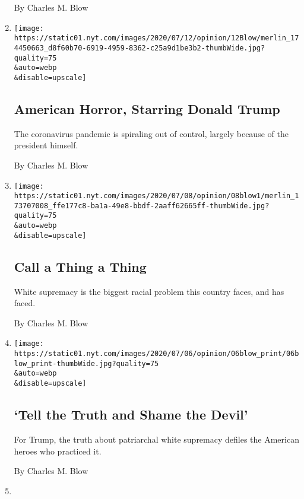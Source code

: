 \begin{enumerate}
  By Charles M. Blow
\item
  \href{/2020/07/12/opinion/coronavirus-donald-trump.html}{}

  \texttt{[image: https://static01.nyt.com/images/2020/07/12/opinion/12Blow/merlin\_174450663\_d8f60b70-6919-4959-8362-c25a9d1be3b2-thumbWide.jpg?quality=75\\\&auto=webp\\\&disable=upscale]}

  \hypertarget{american-horror-starring-donald-trump}{%
  \subsection{American Horror, Starring Donald
  Trump}\label{american-horror-starring-donald-trump}}

  The coronavirus pandemic is spiraling out of control, largely because
  of the president himself.

  By Charles M. Blow
\item
  \href{/2020/07/08/opinion/racism-united-states.html}{}

  \texttt{[image: https://static01.nyt.com/images/2020/07/08/opinion/08blow1/merlin\_173707008\_ffe177c8-ba1a-49e8-bbdf-2aaff62665ff-thumbWide.jpg?quality=75\\\&auto=webp\\\&disable=upscale]}

  \hypertarget{call-a-thing-a-thing}{%
  \subsection{Call a Thing a Thing}\label{call-a-thing-a-thing}}

  White supremacy is the biggest racial problem this country faces, and
  has faced.

  By Charles M. Blow
\item
  \href{/2020/07/05/opinion/trump-monuments.html}{}

  \texttt{[image: https://static01.nyt.com/images/2020/07/06/opinion/06blow\_print/06blow\_print-thumbWide.jpg?quality=75\\\&auto=webp\\\&disable=upscale]}

  \hypertarget{tell-the-truth-and-shame-the-devil}{%
  \subsection{`Tell the Truth and Shame the
  Devil'}\label{tell-the-truth-and-shame-the-devil}}

  For Trump, the truth about patriarchal white supremacy defiles the
  American heroes who practiced it.

  By Charles M. Blow
\item
  \href{/2020/06/28/opinion/george-washington-confederate-statues.html}{}


\end{enumerate}
